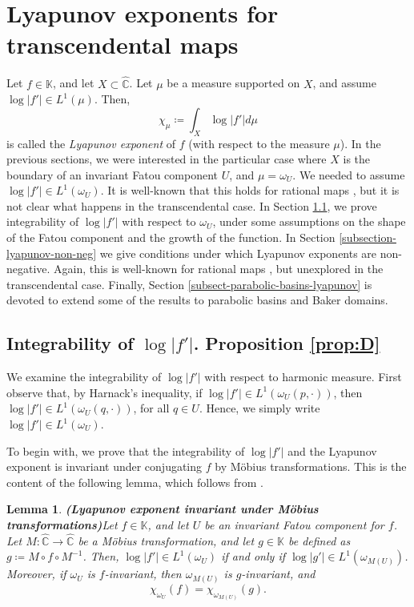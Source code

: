 \documentclass[11pt]{article}
\newtheorem{lemma}[thm]{Lemma}
\theoremstyle{definition}
\theoremstyle{remark}
\newcounter{main}
\theoremstyle{plain}
\begin{document}
\section{Lyapunov exponents for transcendental maps}\label{sect-lyapunov}
 Let $ f\in\mathbb{K} $, and let $ X\subset \widehat{\mathbb{C}} $. Let $ \mu $ be a measure supported on $ X $, and assume $ \log \left| f'\right|  \in L^1(\mu)$. Then,
	\[ \chi_{\mu}\coloneqq \int_{X}\log\left| f'\right| d\mu\] is called the {\em Lyapunov exponent} of $ f $ (with respect to the measure $ \mu$).
In the previous sections, we were interested in the particular case where $ X $ is the boundary of an invariant Fatou component $ U $, and  $\mu= \omega_U $. We needed to assume $ \log \left| f'\right| \in L^1(\omega_U) $. It is well-known that this holds for rational maps \cite{Przytycki-Hausdorff_dimension}, but it is not clear what happens in the transcendental case. In Section \ref{subsection-integrabilitat-log f'}, we prove integrability of $ \log \left| f'\right| $ with respect to $ \omega_U $, under some assumptions on the shape of the Fatou component and the growth of the function.  In Section \ref{subsection-lyapunov-non-neg} we give conditions under which Lyapunov exponents are non-negative. Again, this is well-known for rational maps \cite{Przytycki-Lyapunovexponents}, but unexplored in the transcendental case. Finally, Section \ref{subsect-parabolic-basins-lyapunov} is devoted to extend some of the results to parabolic basins and Baker domains.


\subsection{Integrability of $ \log \left| f'\right|  $. Proposition \ref{prop:D}}\label{subsection-integrabilitat-log f'}

We examine the integrability of $ \log \left| f'\right|  $ with respect to harmonic measure. First observe that, by Harnack's inequality, if $ \log \left| f'\right| \in L^1(\omega_U(p,
\cdot)) $, then  $ \log \left| f'\right| \in L^1(\omega_U(q,
\cdot)) $, for all $ q\in U $. Hence,  we simply write  $\log \left| f'\right| \in L^1(\omega_U) $. 

To begin with, we prove that the integrability of $ \log \left| f'\right|  $ and the Lyapunov exponent is invariant under conjugating $ f $ by Möbius transformations. This is the content of the following lemma, which follows from  \cite[p. 165]{Przytycki-Hausdorff_dimension}. 

\begin{lemma}{\bf (Lyapunov exponent invariant under Möbius transformations)}\label{lemma-conjugate-mobius}
	Let $ f\in \mathbb{K} $, and let $ U $ be an invariant Fatou component for $ f $. Let $ M\colon\widehat{\mathbb{C}}\to \widehat{\mathbb{C}} $ be  a Möbius transformation, and let $ g\in\mathbb{K} $ be defined as $ g\coloneqq M\circ f\circ M^{-1} $. Then, $\log \left| f'\right| \in L^1(\omega_U) $ if and only if $\log \left| g'\right| \in L^1(\omega_{M(U)}) $. Moreover, if $ \omega_U $ is $ f $-invariant, then $ \omega_{M(U)} $ is $ g $-invariant, and \[\chi_{\omega_U} (f)=\chi_{\omega_{M(U)}} (g).\]
\end{lemma}
\end{document}
